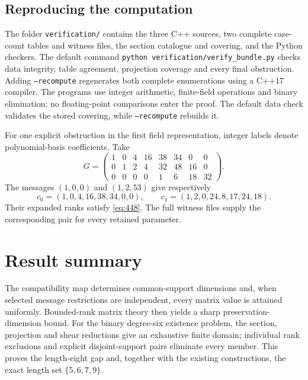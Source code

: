 \documentclass[12pt,letterpaper,onecolumn]{article}
\theoremstyle{definition}
\begin{document}
\subsection{Reproducing the computation}
The folder \texttt{verification/} contains the three C++ sources, two complete case-count tables and witness files, the section catalogue and covering, and the Python checkers. The default command \texttt{python verification/verify\_bundle.py} checks data integrity, table agreement, projection coverage and every final obstruction. Adding \texttt{--recompute} regenerates both complete enumerations using a C++17 compiler. The programs use integer arithmetic, finite-field operations and binary elimination; no floating-point comparisons enter the proof. The default data check validates the stored covering, while \texttt{--recompute} rebuilds it.

For one explicit obstruction in the first field representation, integer labels denote polynomial-basis coefficients. Take
\[
 G=\begin{pmatrix}
 1&0&4&16&38&34&0&0\\
 0&1&2&4&32&48&16&0\\
 0&0&0&0&1&6&18&32
 \end{pmatrix}.
\]
The messages $(1,0,0)$ and $(1,2,53)$ give respectively
\[
c_0=(1,0,4,16,38,34,0,0),\qquad
c_1=(1,2,0,24,8,17,24,18).
\]
Their expanded ranks satisfy \eqref{eq:448}. The full witness files supply the corresponding pair for every retained parameter.

\section{Result summary}
The compatibility map determines common-support dimensions and, when selected message restrictions are independent, every matrix value is attained uniformly. Bounded-rank matrix theory then yields a sharp preservation-dimension bound. For the binary degree-six existence problem, the section, projection and shear reductions give an exhaustive finite domain; individual rank exclusions and explicit disjoint-support pairs eliminate every member. This proves the length-eight gap and, together with the existing constructions, the exact length set $\{5,6,7,9\}$.
\end{document}
